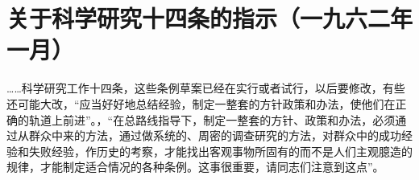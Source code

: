 \section{关于科学研究十四条的指示（一九六二年一月）}


……科学研究工作十四条，这些条例草案已经在实行或者试行，以后要修改，有些还可能大改，“应当好好地总结经验，制定一整套的方针政策和办法，使他们在正确的轨道上前进”。，“在总路线指导下，制定一整套的方针、政策和办法，必须通过从群众中来的方法，通过做系统的、周密的调查研究的方法，对群众中的成功经验和失败经验，作历史的考察，才能找出客观事物所固有的而不是人们主观臆造的规律，才能制定适合情况的各种条例。这事很重要，请同志们注意到这点”。


